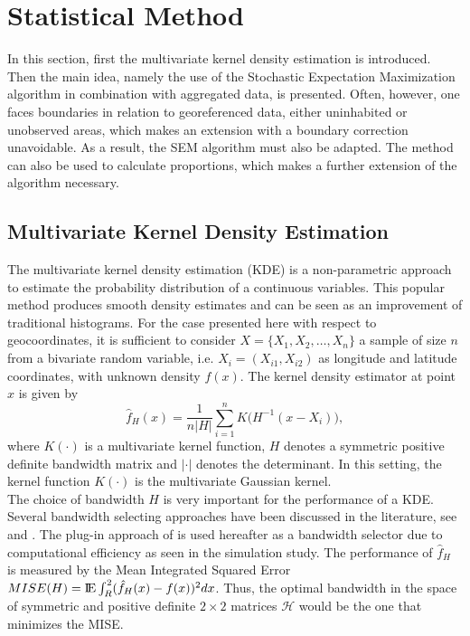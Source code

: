 \section{Statistical Method}
In this section, first the multivariate kernel density estimation is introduced. Then the main idea, namely the use of the Stochastic Expectation Maximization algorithm in combination with aggregated data, is presented. Often, however, one faces boundaries in relation to georeferenced data, either uninhabited or unobserved areas, which makes an extension with a boundary correction unavoidable. As a result, the SEM algorithm must also be adapted. The method can also be used to calculate proportions, which makes a further extension of the algorithm necessary. 

\subsection{Multivariate Kernel Density Estimation}
The multivariate kernel density estimation (KDE) is a non-parametric approach to estimate the probability distribution of a continuous variables.
This popular method produces smooth density estimates and can be seen as an improvement of  traditional histograms. 
For the case presented here with respect to geocoordinates, it is sufficient to consider $X = \{X_1,X_2, \dots,X_n\}$ a sample of size $n$ from a bivariate random variable, i.e. $X_i = (X_{i1}, X_{i2})$ as longitude and latitude coordinates, with unknown density $f(x)$. 
The kernel density estimator at point $x$ is given by
\begin{equation}\label{eq:kde}
  \hat{f}_H(x) =  \frac{1}{n|H|} \sum_{i = 1}^n K\Big(H^{-1}(x-X_i)\Big),
\end{equation}
where $K(\cdot)$ is a multivariate kernel function, $H$ denotes a symmetric positive definite bandwidth matrix and $|\cdot|$ denotes the determinant. 
In this setting, the kernel function $K(\cdot)$ is the multivariate Gaussian kernel.\\ 
The choice of bandwidth $H$ is very important for the
performance of a KDE. 
Several bandwidth selecting approaches have been discussed in the literature, see \cite{Izenman} and \cite{Silverman}. 
The plug-in approach of \cite{Wand94} is used hereafter as a bandwidth selector due to computational efficiency as seen in the simulation study. 
The performance of $\hat{f}_H$ is measured by the Mean Integrated Squared Error 
$ MISE(H) = \E \int_R^2 (\hat{f}_H(x) - f(x))^2 dx $. Thus, the optimal bandwidth in the space of symmetric and positive definite $2 \times 2$ matrices $\mathcal{H}$ would be the one that minimizes the MISE. 
